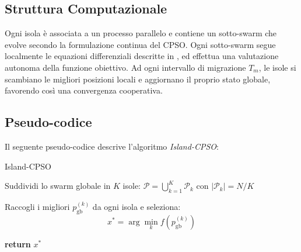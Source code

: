 \documentclass{article}
\begin{document}
\subsection{Struttura Computazionale}

Ogni isola è associata a un processo parallelo e contiene un sotto-swarm che evolve secondo la formulazione continua del CPSO. Ogni sotto-swarm segue localmente le equazioni differenziali descritte in \cite{professoressa}, ed effettua una valutazione autonoma della funzione obiettivo. Ad ogni intervallo di migrazione $T_m$, le isole si scambiano le migliori posizioni locali e aggiornano il proprio stato globale, favorendo così una convergenza cooperativa.

\subsection{Pseudo-codice}

Il seguente pseudo-codice descrive l’algoritmo \textit{Island-CPSO}:

\begin{algorithm}[H]
\caption{Island-CPSO}

Suddividi lo swarm globale in $K$ isole: $\mathcal{P} = \bigcup_{k=1}^K \mathcal{P}_k$ con $|\mathcal{P}_k| = N/K$\\


Raccogli i migliori $p_{\text{gb}}^{(k)}$ da ogni isola e seleziona:
\[
x^\ast = \arg\min_{k} f(p_{\text{gb}}^{(k)})
\]

\textbf{return} $x^\ast$
\end{algorithm}
\end{document}
